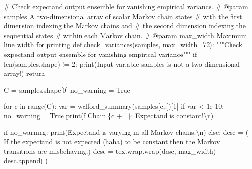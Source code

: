 \documentclass[
  letterpaper,
  DIV=11,
  numbers=noendperiod]{scrartcl}
\newenvironment{Shaded}{\begin{snugshade}}{\end{snugshade}}
\newcommand{\BuiltInTok}[1]{\textcolor[rgb]{0.00,0.23,0.31}{#1}}
\newcommand{\CharTok}[1]{\textcolor[rgb]{0.13,0.47,0.30}{#1}}
\newcommand{\CommentTok}[1]{\textcolor[rgb]{0.37,0.37,0.37}{#1}}
\newcommand{\ControlFlowTok}[1]{\textcolor[rgb]{0.00,0.23,0.31}{#1}}
\newcommand{\DecValTok}[1]{\textcolor[rgb]{0.68,0.00,0.00}{#1}}
\newcommand{\FloatTok}[1]{\textcolor[rgb]{0.68,0.00,0.00}{#1}}
\newcommand{\KeywordTok}[1]{\textcolor[rgb]{0.00,0.23,0.31}{#1}}
\newcommand{\NormalTok}[1]{\textcolor[rgb]{0.00,0.23,0.31}{#1}}
\newcommand{\OperatorTok}[1]{\textcolor[rgb]{0.37,0.37,0.37}{#1}}
\newcommand{\SpecialCharTok}[1]{\textcolor[rgb]{0.37,0.37,0.37}{#1}}
\newcommand{\SpecialStringTok}[1]{\textcolor[rgb]{0.13,0.47,0.30}{#1}}
\newcommand{\StringTok}[1]{\textcolor[rgb]{0.13,0.47,0.30}{#1}}
\newcommand{\VariableTok}[1]{\textcolor[rgb]{0.07,0.07,0.07}{#1}}
\begin{document}
\begin{Shaded}
\begin{Highlighting}[]

\CommentTok{\# Check expectand output ensemble for vanishing empirical variance.}
\CommentTok{\# @param samples A two{-}dimensional array of scalar Markov chain states }
\CommentTok{\#                with the first dimension indexing the Markov chains and }
\CommentTok{\#                the second dimension indexing the sequential states }
\CommentTok{\#                within each Markov chain.}
\CommentTok{\# @param max\_width Maximum line width for printing}
\KeywordTok{def}\NormalTok{ check\_variances(samples, max\_width}\OperatorTok{=}\DecValTok{72}\NormalTok{):}
  \CommentTok{"""Check expectand output ensemble for vanishing empirical variance"""}
  \ControlFlowTok{if} \BuiltInTok{len}\NormalTok{(samples.shape) }\OperatorTok{!=} \DecValTok{2}\NormalTok{:}
    \BuiltInTok{print}\NormalTok{(}\StringTok{\textquotesingle{}Input variable \textasciigrave{}samples\textasciigrave{} is not a two{-}dimensional array!\textquotesingle{}}\NormalTok{)}
    \ControlFlowTok{return}
  
\NormalTok{  C }\OperatorTok{=}\NormalTok{ samples.shape[}\DecValTok{0}\NormalTok{]}
\NormalTok{  no\_warning }\OperatorTok{=} \VariableTok{True}
  
  \ControlFlowTok{for}\NormalTok{ c }\KeywordTok{in} \BuiltInTok{range}\NormalTok{(C):}
\NormalTok{    var }\OperatorTok{=}\NormalTok{ welford\_summary(samples[c,:])[}\DecValTok{1}\NormalTok{]}
    \ControlFlowTok{if}\NormalTok{ var }\OperatorTok{\textless{}} \FloatTok{1e{-}10}\NormalTok{:}
\NormalTok{      no\_warning }\OperatorTok{=} \VariableTok{True}
      \BuiltInTok{print}\NormalTok{(}\SpecialStringTok{f\textquotesingle{}  Chain }\SpecialCharTok{\{}\NormalTok{c }\OperatorTok{+} \DecValTok{1}\SpecialCharTok{\}}\SpecialStringTok{: Expectand is constant!}\CharTok{\textbackslash{}n}\SpecialStringTok{\textquotesingle{}}\NormalTok{)}
  
  \ControlFlowTok{if}\NormalTok{ no\_warning:}
    \BuiltInTok{print}\NormalTok{(}\StringTok{\textquotesingle{}Expectand is varying in all Markov chains.}\CharTok{\textbackslash{}n}\StringTok{\textquotesingle{}}\NormalTok{)}
  \ControlFlowTok{else}\NormalTok{:}
\NormalTok{    desc }\OperatorTok{=}\NormalTok{ (}\StringTok{\textquotesingle{}  If the expectand is not expected (haha) to be \textquotesingle{}}
            \StringTok{\textquotesingle{}constant then the Markov transitions are misbehaving.\textquotesingle{}}\NormalTok{)}
\NormalTok{    desc }\OperatorTok{=}\NormalTok{ textwrap.wrap(desc, max\_width)}
\NormalTok{    desc.append(}\StringTok{\textquotesingle{} \textquotesingle{}}\NormalTok{)}
\end{Highlighting}
\end{Shaded}
\end{document}
